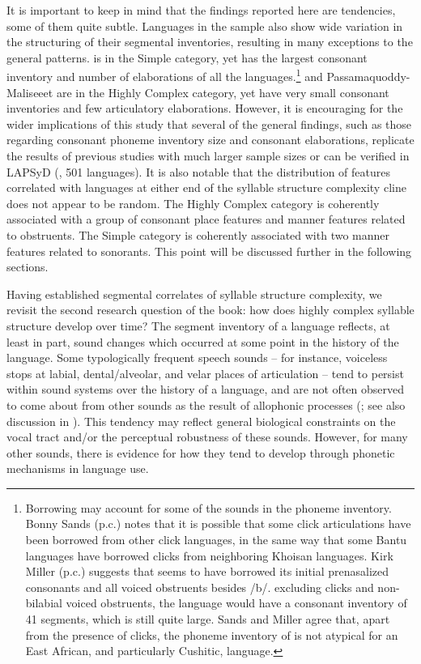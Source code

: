   It is important to keep in mind that the findings reported here are tendencies, some of them quite subtle. Languages in the sample also show wide variation in the structuring of their segmental inventories, resulting in many exceptions to the general patterns.  is in the Simple category, yet has the largest consonant inventory and number of elaborations of all the languages.\footnote{{Borrowing may account for some of the sounds in the  phoneme inventory. Bonny Sands (p.c.) notes that it is possible that some click articulations have been borrowed from other click languages, in the same way that some Bantu languages have borrowed clicks from neighboring Khoisan languages. Kirk Miller (p.c.) suggests that  seems to have borrowed its initial prenasalized consonants and all voiced obstruents besides /b/.  excluding clicks and non-bilabial voiced obstruents, the language would have a consonant inventory of 41 segments, which is still quite large. Sands and Miller agree that, apart from the presence of clicks, the phoneme inventory of  is not atypical for an East African, and particularly Cushitic, language.}}  and Passamaquoddy-Maliseeet are in the Highly Complex category, yet have very small consonant inventories and few articulatory elaborations. However, it is encouraging for the wider implications of this study that several of the general findings, such as those regarding consonant phoneme inventory size and consonant elaborations, replicate the results of previous studies with much larger sample sizes or can be verified in LAPSyD (\citealt{MaddiesonEtAl2013}, 501 languages). It is also notable that the distribution of features correlated with languages at either end of the syllable structure complexity cline does not appear to be random. The Highly Complex category is coherently associated with a group of consonant place features and manner features related to obstruents. The Simple category is coherently associated with two manner features related to sonorants. This point will be discussed further in the following sections.

  Having established segmental correlates of syllable structure complexity, we revisit the second research question of the book: how does highly complex syllable structure develop over time? The segment inventory of a language reflects, at least in part, sound changes which occurred at some point in the history of the language. Some typologically frequent speech sounds -- for instance, voiceless stops at labial, dental/alveolar, and velar places of articulation -- tend to persist within sound systems over the history of a language, and are not often observed to come about from other sounds as the result of allophonic processes (\citealt{Bybee2015a}; see also discussion in ). This tendency may reflect general biological constraints on the vocal tract and/or the perceptual robustness of these sounds. However, for many other sounds, there is evidence for how they tend to develop through phonetic mechanisms in language use. 

